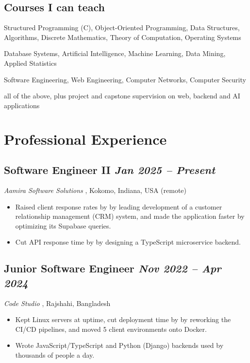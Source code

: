 \documentclass[10pt, a4paper]{article}
\newcommand{\datedsubsection}[2]{\needspace{8\baselineskip}\subsection*{#1 \hfill \small\textit{#2}}}
\newcommand{\resitem}[1]{\item #1}
\begin{document}
\subsection*{Courses I can teach}
\begin{description}[style=unboxed, leftmargin=0pt]
    \item[Programming and core CS:] Structured Programming (C), Object-Oriented Programming, Data Structures, Algorithms, Discrete Mathematics, Theory of Computation, Operating Systems
    \item[Data and AI:] Database Systems, Artificial Intelligence, Machine Learning, Data Mining, Applied Statistics
    \item[Systems and software:] Software Engineering, Web Engineering, Computer Networks, Computer Security
    \item[Labs:] all of the above, plus project and capstone supervision on web, backend and AI applications
\end{description}

\section{Professional Experience}

\datedsubsection{Software Engineer II}{Jan 2025 -- Present}
\textit{Aamira Software Solutions} \href{https://aamira.ca/}{\small\faExternalLink*}, Kokomo, Indiana, USA (remote)
\begin{itemize}
    \resitem{Raised client response rates by \factExpAamiraCrm{} by leading development of a customer relationship management (CRM) system, and made the application \factExpAamiraSpeed{} faster by optimizing its Supabase queries.}
    \resitem{Cut API response time by \factExpAamiraApi{} by designing a TypeScript microservice backend.}
\end{itemize}

\datedsubsection{Junior Software Engineer}{Nov 2022 -- Apr 2024}
\textit{Code Studio} \href{https://www.linkedin.com/company/code-studio4/}{\small\faExternalLink*}, Rajshahi, Bangladesh
\begin{itemize}
    \resitem{Kept \factExpCodestudioServers{} Linux servers at \factExpCodestudioUptime{} uptime, cut deployment time by \factExpCodestudioDeploy{} by reworking the CI/CD pipelines, and moved 5 client environments onto Docker.}
    \resitem{Wrote JavaScript/TypeScript and Python (Django) backends used by thousands of people a day.}
\end{itemize}
\end{document}
